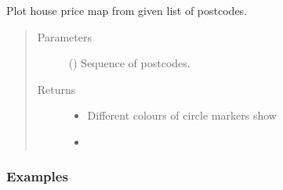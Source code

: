 \documentclass[letterpaper,10pt,english]{sphinxmanual}
\begin{document}
\begin{fulllineitems}
\label{\detokenize{index:flood_tool.plot_house_price}}
\sphinxAtStartPar
Plot house price map from given list of postcodes.
\begin{quote}\begin{description}
\item[{Parameters}] \leavevmode
\sphinxAtStartPar
{} () \textendash{} Sequence of postcodes.

\item[{Returns}] \leavevmode
\sphinxAtStartPar
\begin{itemize}
\item {} 
\sphinxAtStartPar
{} \textendash{} Different colours of circle markers show

\item {} 
\sphinxAtStartPar
{}

\end{itemize}


\end{description}\end{quote}
\subsubsection*{Examples}

\begin{sphinxVerbatim}[commandchars=\\\{\}]
\PYG{p}{[} \PYG{p}{]}
\end{sphinxVerbatim}

\end{fulllineitems}

\end{document}
